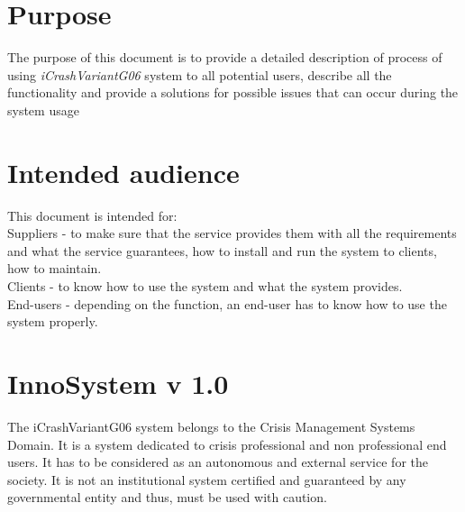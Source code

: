 
 


\section{Purpose}
The purpose of this document is to provide a detailed description of process of
using {\emph{iCrashVariantG06}} system to all potential users, describe all the
functionality and provide a solutions for possible issues that can occur during the system usage


\section{Intended audience}

This document is intended for:\\
Suppliers - to make sure that the service provides them with all the
requirements and what the service guarantees, how to install and run the system to clients,
how to maintain.\\ 
Clients  - to know how to use the system and what the system provides.\\ 
End-users - depending on the function, an end-user has to know how to use the
system properly.


\section{InnoSystem v 1.0}
The iCrashVariantG06 system belongs to the Crisis Management Systems Domain. It is a
system dedicated to crisis professional and non professional end users. It has
to be considered as an autonomous and external service for the society. It is not an institutional system certified and guaranteed by any governmental entity and thus, must be used with caution.\\


